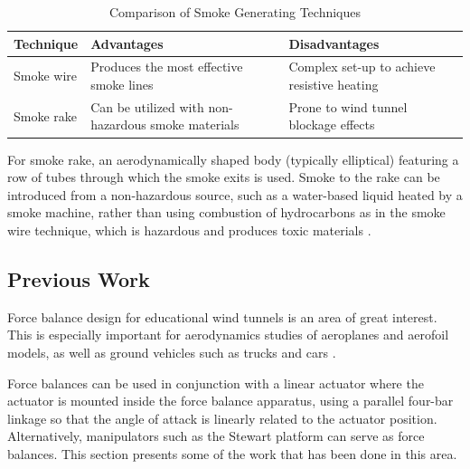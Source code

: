 \begin{center}
	\begin{table}[H]
		\caption[Smoke Generating Techniques]{Comparison of Smoke Generating Techniques}
	
	\begin{tabular}{|p{5cm}|p{5cm}|p{5cm}|}
		\hline
		\textbf{Technique} & \textbf{Advantages}                                & \textbf{Disadvantages}                      \\
		\hline
		Smoke wire         & Produces the most effective smoke lines            & Complex set-up to achieve resistive heating \\
		\hline
		Smoke rake         & Can be utilized with non-hazardous smoke materials & Prone to wind tunnel blockage effects       \\
		\hline
	\end{tabular}
\end{table}
\end{center}
For smoke rake, an aerodynamically shaped
body (typically elliptical) featuring a row of tubes through which the smoke exits is used. Smoke to the rake can be introduced from a non-hazardous source,
such as a water-based liquid heated by a
smoke machine, rather than using combustion of hydrocarbons as in the smoke wire technique, which is hazardous and produces toxic materials \cite{trinder2013development}.

\subsection{Previous Work}
Force balance design for educational wind tunnels is an area of great interest. This is especially important
for aerodynamics studies of aeroplanes and aerofoil models, as well as ground vehicles such as trucks
and cars \cite{morris_force_2010}.

Force balances can be used in conjunction with a linear actuator where the
actuator is mounted inside the force balance apparatus, using a parallel four-bar linkage so that
the angle of attack is linearly related to the actuator position. Alternatively, manipulators such as the Stewart platform can serve as force balances. This section presents some of the work that has been done in this area.
